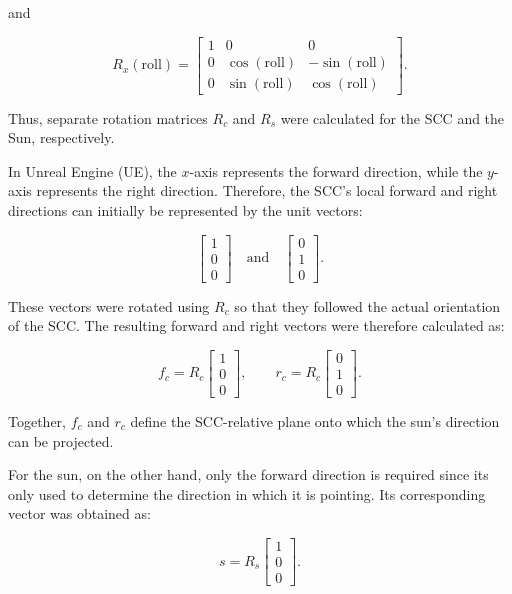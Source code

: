 and

\[
R_x(\mathrm{roll}) =
\begin{bmatrix}
1 & 0 & 0\\
0 & \cos(\mathrm{roll}) & -\sin(\mathrm{roll})\\
0 & \sin(\mathrm{roll}) & \cos(\mathrm{roll})
\end{bmatrix}.
\]

Thus, separate rotation matrices \(R_c\) and \(R_s\) were calculated for the SCC and the Sun, respectively.

In Unreal Engine (UE), the \(x\)-axis represents the forward direction, while the \(y\)-axis represents the right direction. Therefore, the SCC's local forward and right directions can initially be represented by the unit vectors:

\[
\begin{bmatrix}1\\0\\0\end{bmatrix}
\quad\text{and}\quad
\begin{bmatrix}0\\1\\0\end{bmatrix}.
\]

These vectors were rotated using \(R_c\) so that they followed the actual orientation of the SCC. The resulting forward and right vectors were therefore calculated as:

\[
f_c = R_c
\begin{bmatrix}
1\\0\\0
\end{bmatrix},
\qquad
r_c = R_c
\begin{bmatrix}
0\\1\\0
\end{bmatrix}.
\]

Together, \(f_c\) and \(r_c\) define the SCC-relative plane onto which the sun's direction can be projected. 


For the sun, on the other hand, only the forward direction is required since its only used to determine the direction in which it is pointing. Its corresponding vector was obtained as:

\[
s = R_s
\begin{bmatrix}
1\\0\\0
\end{bmatrix}.
\]

